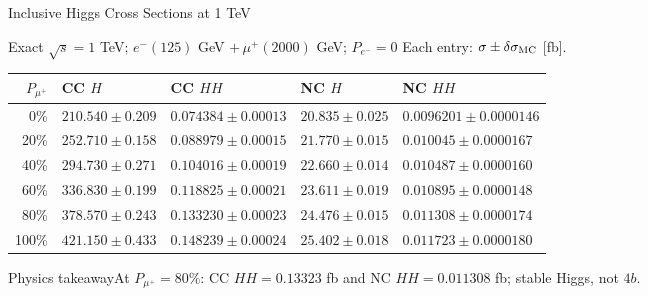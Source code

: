 \documentclass[aspectratio=1610,english]{beamer}
\newcommand{\src}[1]{\vfill{\par\color{black!65}\fontsize{6.4}{7.4}\selectfont\emph{Source:} #1\par}}
\newcommand{\key}[1]{\begin{alertblock}{Physics takeaway}\scriptsize #1\end{alertblock}}
\begin{document}
\begin{frame}[t]{Inclusive Higgs Cross Sections at 1 TeV}
\scriptsize

\begin{block}{Exact $\sqrt{s}=1$ TeV; $e^-(125)$ GeV $+\,\mu^+(2000)$ GeV; $P_{e^-}=0$}
\scriptsize\centering Each entry: $\sigma\pm\delta\sigma_{\rm MC}$ [fb].\\[-.6em]
\begin{center}\setlength{\tabcolsep}{3pt}\renewcommand{\arraystretch}{1.23}\begin{tabular}{rllll}\toprule $P_{\mu^+}$ & CC $H$ & CC $HH$ & NC $H$ & NC $HH$ \\ \midrule
0\% & $210.540\pm0.209$ & $0.074384\pm0.00013$ & $20.835\pm0.025$ & $0.0096201\pm0.0000146$ \\
20\% & $252.710\pm0.158$ & $0.088979\pm0.00015$ & $21.770\pm0.015$ & $0.010045\pm0.0000167$ \\
40\% & $294.730\pm0.271$ & $0.104016\pm0.00019$ & $22.660\pm0.014$ & $0.010487\pm0.0000160$ \\
60\% & $336.830\pm0.199$ & $0.118825\pm0.00021$ & $23.611\pm0.019$ & $0.010895\pm0.0000148$ \\
80\% & $378.570\pm0.243$ & $0.133230\pm0.00023$ & $24.476\pm0.015$ & $0.011308\pm0.0000174$ \\
100\% & $421.150\pm0.433$ & $0.148239\pm0.00024$ & $25.402\pm0.018$ & $0.011723\pm0.0000180$ \\
\bottomrule\end{tabular}\end{center}
\end{block}
\key{At $P_{\mu^+}=80\%$: CC $HH=0.13323$ fb and NC $HH=0.011308$ fb; stable Higgs, not $4b$.}

\end{frame}
\end{document}
